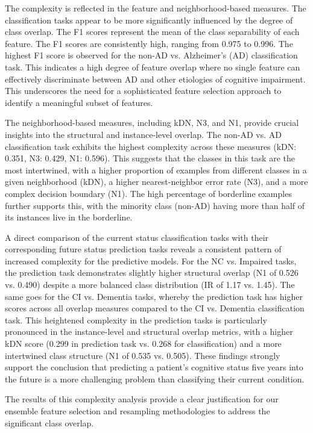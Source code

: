 The complexity is reflected in the feature and neighborhood-based measures. The classification tasks appear to be more significantly influenced by the degree of class overlap. The F1 scores represent the mean of the class separability of each feature. The F1 scores are consistently high, ranging from 0.975 to 0.996. The highest F1 score is observed for the non-AD vs. Alzheimer's (AD) classification task. This indicates a high degree of feature overlap where no single feature can effectively discriminate between AD and other etiologies of cognitive impairment. This underscores the need for a sophisticated feature selection approach to identify a meaningful subset of features.

The neighborhood-based measures, including kDN, N3, and N1, provide crucial insights into the structural and instance-level overlap. The non-AD vs. AD classification task exhibits the highest complexity across these measures (kDN: 0.351, N3: 0.429, N1: 0.596). This suggests that the classes in this task are the most intertwined, with a higher proportion of examples from different classes in a given neighborhood (\acrshort{kDN}), a higher nearest-neighbor error rate (N3), and a more complex decision boundary (N1). The high percentage of borderline examples further supports this, with the minority class (non-AD) having more than half of its instances live in the borderline.

A direct comparison of the current status classification tasks with their corresponding future status prediction tasks reveals a consistent pattern of increased complexity for the predictive models. For the NC vs. Impaired tasks, the prediction task demonstrates slightly higher structural overlap (N1 of 0.526 vs. 0.490) despite a more balanced class distribution (IR of 1.17 vs. 1.45). The same goes for the CI vs. Dementia tasks, whereby the prediction task has higher scores across all overlap measures compared to the CI vs. Dementia classification task. This heightened complexity in the prediction tasks is particularly pronounced in the instance-level and structural overlap metrics, with a higher kDN score (0.299 in prediction task vs. 0.268 for classification) and a more intertwined class structure (N1 of 0.535 vs. 0.505). These findings strongly support the conclusion that predicting a patient's cognitive status five years into the future is a more challenging problem than classifying their current condition.

The results of this complexity analysis provide a clear justification for our ensemble feature selection and resampling methodologies to address the significant class overlap.

